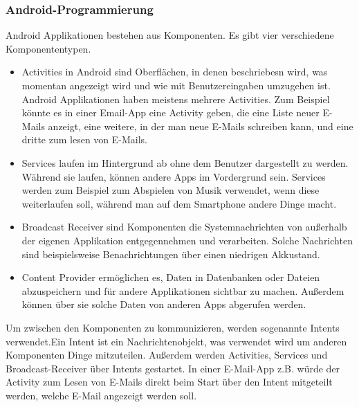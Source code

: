 \documentclass[extern,palatino]{cgBA}
\begin{document}
\subsubsection{Android-Programmierung}Android Applikationen bestehen aus Komponenten. Es gibt vier verschiedene Komponententypen.\cite{and1}
\begin{itemize}
	\item 
	Activities in Android sind Oberflächen, in denen beschriebesn wird, was momentan angezeigt wird und wie mit Benutzereingaben umzugehen ist. Android Applikationen haben meistens mehrere Activities. Zum Beispiel könnte es in einer Email-App eine Activity geben, die eine Liste neuer E-Mails anzeigt, eine weitere, in der man neue E-Mails schreiben kann, und eine dritte zum lesen von E-Mails. \cite{and1}
	\item
	Services laufen im Hintergrund ab ohne dem Benutzer dargestellt zu werden. Während sie laufen, können andere Apps im Vordergrund sein. Services werden zum Beispiel zum  Abspielen von Musik verwendet, wenn diese weiterlaufen soll, während man auf dem Smartphone andere Dinge macht.\cite{and1}
	\item Broadcast Receiver sind Komponenten die Systemnachrichten von außerhalb der eigenen Applikation entgegennehmen und verarbeiten. Solche Nachrichten sind beispielsweise Benachrichtungen über einen niedrigen Akkustand.\cite{and1}
	\item Content Provider ermöglichen es, Daten in Datenbanken oder Dateien abzuspeichern und für andere Applikationen sichtbar zu machen. Außerdem können über sie solche Daten von anderen Apps abgerufen werden.\cite{and1}
\end{itemize}
Um zwischen den Komponenten zu kommunizieren, werden sogenannte Intents verwendet.Ein Intent ist ein Nachrichtenobjekt, was verwendet wird um anderen Komponenten Dinge mitzuteilen\cite{and2}. Außerdem werden Activities, Services und Broadcast-Receiver über Intents gestartet. In einer E-Mail-App z.B. würde der Activity zum Lesen von E-Mails direkt beim Start über den Intent mitgeteilt werden, welche E-Mail angezeigt werden soll.
\end{document}
